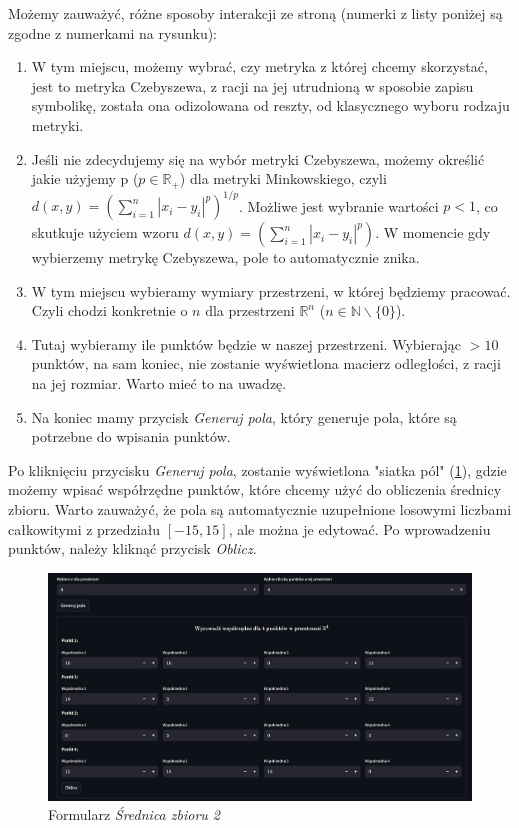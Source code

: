 \documentclass[article,11pt]{mwrep}
\newcommand{\R}{{\mathbb R}}
\newcommand{\N}{{\mathbb N}}
\begin{document}
Możemy zauważyć, różne sposoby interakcji ze stroną (numerki z listy poniżej są zgodne z numerkami na rysunku):
\begin{enumerate}
    \item W tym miejscu, możemy wybrać, czy metryka z której chcemy skorzystać, jest to metryka Czebyszewa, z racji na jej utrudnioną w sposobie zapisu symbolikę, została ona odizolowana od reszty, od klasycznego wyboru rodzaju metryki.
    \item Jeśli nie zdecydujemy się na wybór metryki Czebyszewa, możemy określić jakie użyjemy p ($p\in\R_+$) dla metryki Minkowskiego, czyli $d(x,y)=\left(\sum_{i=1}^n |x_i-y_i|^p\right)^{1/p}$. Możliwe jest wybranie wartości $p < 1$, co skutkuje użyciem wzoru $d(x,y)=\left(\sum_{i=1}^n |x_i-y_i|^p\right)$. W momencie gdy wybierzemy metrykę Czebyszewa, pole to automatycznie znika.
    \item W tym miejscu wybieramy wymiary przestrzeni, w której będziemy pracować. Czyli chodzi konkretnie o $n$ dla przestrzeni $\R^n$ ($n\in\N\backslash \{0\} $).
    \item Tutaj wybieramy ile punktów będzie w naszej przestrzeni. Wybierając $>10$ punktów, na sam koniec, nie zostanie wyświetlona macierz odległości, z racji na jej rozmiar. Warto mieć to na uwadzę.
    \item Na koniec mamy przycisk \textit{Generuj pola}, który generuje pola, które są potrzebne do wpisania punktów.
\end{enumerate}

Po kliknięciu przycisku \textit{Generuj pola}, zostanie wyświetlona "siatka pól" (\ref{rys:sp}), gdzie możemy wpisać współrzędne punktów, które chcemy użyć do obliczenia średnicy zbioru. Warto zauważyć, że pola są automatycznie uzupełnione losowymi liczbami całkowitymi z przedziału $[-15,15]$, ale można je edytować. Po wprowadzeniu punktów, należy kliknąć przycisk \textit{Oblicz}.

\begin{figure}[H] 
    \centering
    \includegraphics[width=1\textwidth]{figure/Screenshot_3.jpg}
    \caption{Formularz \textit{Średnica zbioru 2}}\label{rys:sp}
\end{figure}
\end{document}
